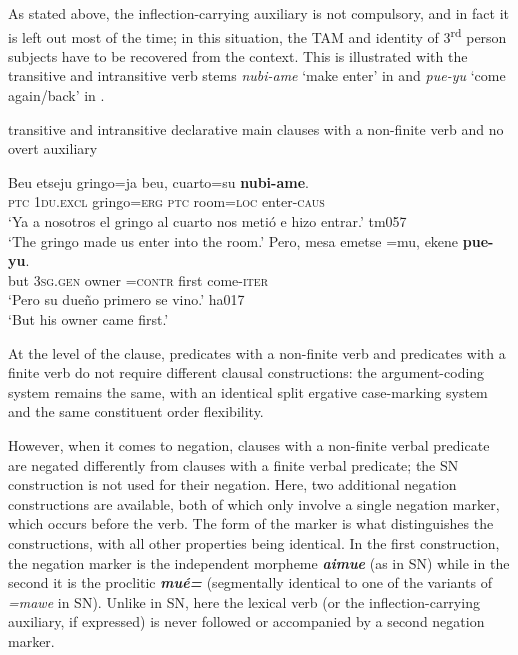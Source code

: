 \documentclass[output=paper]{langsci/langscibook}
\begin{document}
As stated above, the inflection-carrying auxiliary is not compulsory, and
in fact it is left out most of the time; in this situation, the TAM and
identity of 3\textsuperscript{rd} person subjects have to be recovered from
the context. This is illustrated with the transitive and intransitive verb
stems \textit{nubi-ame} `make enter' in  and
\textit{pue-yu} `come again\slash back' in
.
%
\begin{exe}\ex \label{ex:tacana-infinite-gringo-owner}  transitive and intransitive declarative main clauses with a non-finite verb and no overt auxiliary
\begin{xlist}
\ex\label{ex:tacana-infinite-gringo}
\gll  Beu  etseju
gringo=ja  beu,  cuarto=su
\textbf{nubi-ame}.
\\
    \textsc{ptc} \textsc{1du.excl} gringo=\textsc{erg} \textsc{ptc}
    room=\textsc{loc}  enter-\textsc{caus}\\
\glt `Ya a nosotros el gringo al cuarto nos metió e hizo entrar.' tm057\\
`The gringo made us enter into the room.'
\ex\label{ex:tacana-infinite-owner}
\gll Pero, mesa
emetse{\cb} =mu, ekene
\textbf{pue-yu}.\\
    but  \textsc{3sg.gen}  owner  =\textsc{contr}  first
    come-\textsc{iter}\\
\glt `Pero su dueño primero se vino.' ha017\\
`But his owner came first.'
\end{xlist}\end{exe}

At the level of the clause, predicates with a non-finite verb and predicates with a finite verb do not require different clausal constructions: the argument-coding system remains the same, with an identical split ergative case-marking system and the same constituent order flexibility.

However, when it comes to negation, clauses with a non-finite verbal
predicate are negated differently from clauses with a finite verbal
predicate; the SN construction is not used for their negation. Here, two
additional negation constructions are available, both of which only involve
a single negation marker, which occurs before the verb. The form of the
marker is what distinguishes the constructions, with all other properties
being identical. In the first construction, the negation marker is the
independent morpheme \textbf{\textit{aimue}} (as in SN) while in the
second it is the proclitic \textbf{\textit{mué=}} (segmentally identical
to one of the variants of \textit{=mawe} in SN). Unlike in SN, here the
lexical verb (or the inflection-carrying auxiliary, if expressed) is never
followed or accompanied by a second negation marker.
\end{document}
